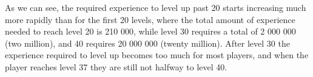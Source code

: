
As we can see, the required experience to level up past 20 starts increasing much more rapidly than for the first 20 levels, where the total amount of experience needed to reach level 20 is 210 000, while level 30 requires a total of 2 000 000 (two million), and 40 requires 20 000 000 (twenty million). After level 30 the experience required to level up becomes too much for most players, and when the player reaches level 37 they are still not halfway to level 40.

